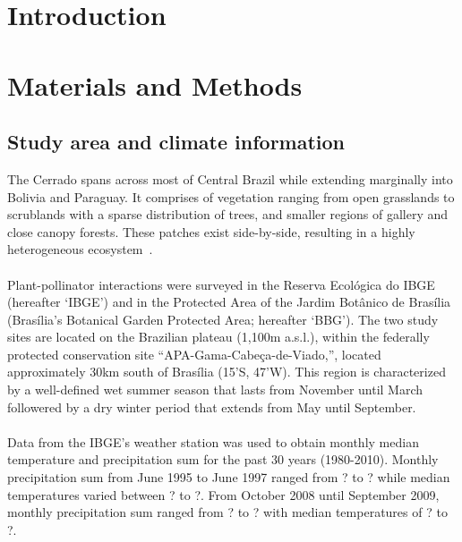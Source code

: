 \documentclass[11pt]{article}
\begin{document}
\newpage
\pagestyle{fancy}
\fancyhf{}
\renewcommand{\headrulewidth}{0pt}

\section{Introduction} 




\newpage
\section{Materials and Methods} 
\subsection{Study area and climate information}
The Cerrado spans across most of Central Brazil while extending marginally into Bolivia and Paraguay. It comprises of vegetation ranging from open grasslands to scrublands with a sparse distribution of trees, and smaller regions of gallery and close canopy forests. These patches exist side-by-side, resulting in a highly heterogeneous ecosystem~\citep{Gottsberger2006}. \\
\\
Plant-pollinator interactions were surveyed in the Reserva Ecol\'ogica do IBGE (hereafter `IBGE') and in the Protected Area of the Jardim Bot\^anico de Bras\'ilia (Bras\'ilia's Botanical Garden Protected Area; hereafter `BBG'). The two study sites are located on the Brazilian plateau (1,100m a.s.l.), within the federally protected conservation site ``APA-Gama-Cabe\c ca-de-Viado,'', located approximately 30km south of Bras\'ilia (15'S, 47'W). This region is characterized by a well-defined wet summer season that lasts from November until March followered by a dry winter period that extends from May until September.  \\
\\
Data from the IBGE's weather station was used to obtain monthly median temperature and precipitation sum for the past 30 years (1980-2010). Monthly precipitation sum from June 1995 to June 1997 ranged from ? to ? while median temperatures varied between ? to ?. From October 2008 until September 2009, monthly precipitation sum ranged from ? to ? with median temperatures of ? to ?.\\
\end{document}

